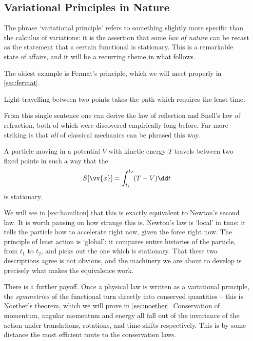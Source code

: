 \documentclass[a4paper]{scrartcl}
\begin{document}
\subsection{Variational Principles in Nature}

The phrase `variational principle' refers to something slightly more specific than the calculus of variations: it is the assertion that some \emph{law of nature} can be recast as the statement that a certain functional is stationary. This is a remarkable state of affairs, and it will be a recurring theme in what follows.

The oldest example is Fermat's principle, which we will meet properly in \autoref{sec:fermat}.

\begin{law}
	Light travelling between two points takes the path which requires the least time.
\end{law}

From this single sentence one can derive the law of reflection and Snell's law of refraction, both of which were discovered empirically long before. Far more striking is that \emph{all} of classical mechanics can be phrased this way.

\begin{law}
	A particle moving in a potential $V$ with kinetic energy $T$ travels between two fixed points in such a way that the 
	$$
	S[\vv{x}] = \int_{t_1}^{t_2} (T - V) \dd t
	$$
	is stationary.
\end{law}

We will see in \autoref{sec:hamilton} that this is exactly equivalent to Newton's second law. It is worth pausing on how strange this is. Newton's law is `local' in time: it tells the particle how to accelerate right now, given the force right now. The principle of least action is `global': it compares entire histories of the particle, from $t_1$ to $t_2$, and picks out the one which is stationary. That these two descriptions agree is not obvious, and the machinery we are about to develop is precisely what makes the equivalence work.

There is a further payoff. Once a physical law is written as a variational principle, the \emph{symmetries} of the functional turn directly into conserved quantities -- this is Noether's theorem, which we will prove in \autoref{sec:noether}. Conservation of momentum, angular momentum and energy all fall out of the invariance of the action under translations, rotations, and time-shifts respectively. This is by some distance the most efficient route to the conservation laws.
\end{document}
